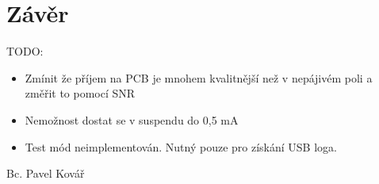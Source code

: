 \section{Závěr}
\label{sec:Conclusion}

TODO:
\begin{itemize}
\item Zmínit že příjem na PCB je mnohem kvalitnější než v nepájivém poli a změřit to pomocí SNR

\item Nemožnost dostat se v suspendu do 0,5 mA
\item Test mód neimplementován. Nutný pouze pro získání USB loga.

\end{itemize}

\bigskip
\begin{flushright}
Bc. Pavel Kovář
\end{flushright}